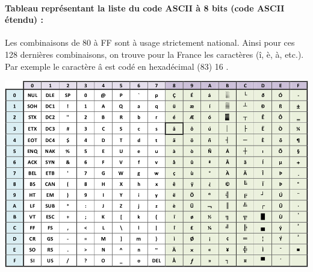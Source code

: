 \documentclass{article}
\begin{document}
\paragraph{Tableau représentant la liste du code ASCII à 8 bits (code ASCII étendu) :\\}
Les combinaisons de 80 à FF sont à usage strictement national. Ainsi pour ces 128 dernières combinaisons, on trouve
pour la France les caractères (î, è, à, etc.). Par exemple le caractère â est codé en hexadécimal (83) 16 .
\begin{center}
	\includegraphics[scale=.6]{./figures/ascii3.png}
\end{center}
\end{document}
